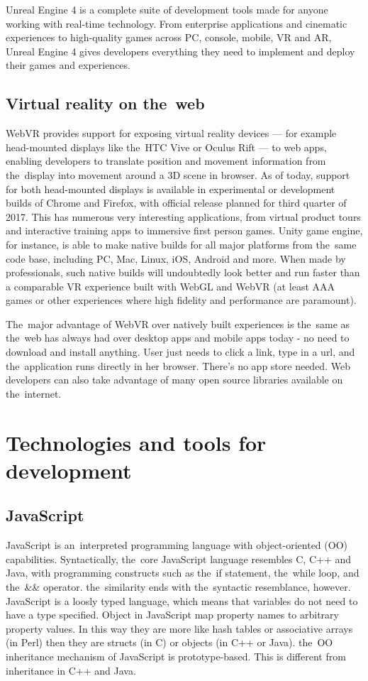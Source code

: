 Unreal Engine 4 is a complete suite of development tools made for anyone working with real-time technology. From enterprise applications and cinematic experiences to high-quality games across PC, console, mobile, VR and AR, Unreal Engine 4 gives developers everything they need to implement and deploy their games and experiences. \cite{unrealengine}

\subsection{Virtual reality on the~web}
WebVR provides support for exposing virtual reality devices — for example head-mounted displays like the~HTC Vive or Oculus Rift — to web apps, enabling developers to translate position and movement information from the~display into movement around a 3D scene in browser. As of today, support for both head-mounted displays is available in experimental or development builds of Chrome and Firefox, with official release planned for third quarter of 2017. This has numerous very interesting applications, from virtual product tours and interactive training apps to immersive first person games.
Unity game engine, for instance, is able to make native builds for all major platforms from the~same code base, including PC, Mac, Linux, iOS, Android and more. When made by professionals, such native builds will undoubtedly look better and run faster than a comparable VR experience built with WebGL and WebVR (at least AAA games or other experiences where high fidelity and performance are paramount).

The~major advantage of WebVR over natively built experiences is the~same as the~web has always had over desktop apps and mobile apps today - no need to download and install anything. User just needs to click a link, type in a url, and the~application runs directly in her browser. There’s no app store needed. Web developers can also take advantage of many open source libraries available on the~internet.

\section{Technologies and tools for development}
\subsection{JavaScript}
JavaScript is an~interpreted programming language with object-oriented (OO) capabilities. Syntactically, the~core JavaScript language resembles C, C++ and Java, with programming constructs such as the~if statement, the~while loop, and the~&& operator. the~similarity ends with the~syntactic resemblance, however. JavaScript is a loosly typed language, which means that variables do not need to have a type specified. Object in JavaScript map property names to arbitrary property values. In this way they are more like hash tables or associative arrays (in Perl) then they are structs (in C) or objects (in C++ or Java). the~OO inheritance mechanism of JavaScript is prototype-based. This is different from inheritance in C++ and Java. \cite{flanagan}

